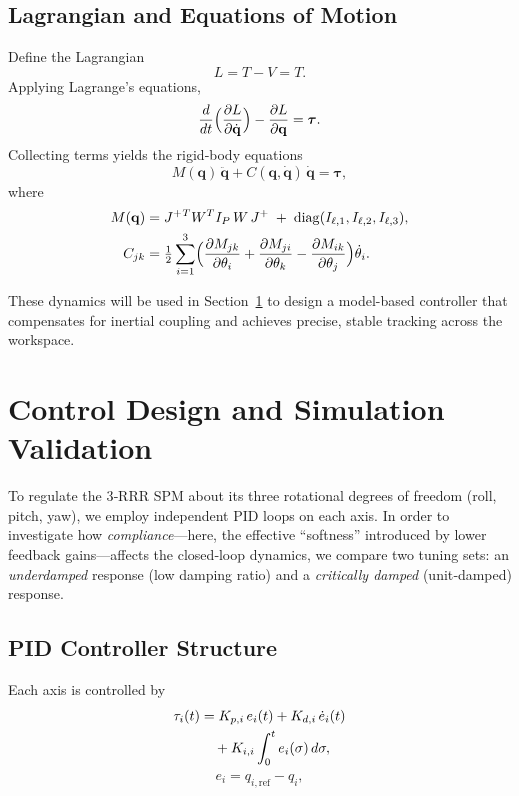 \documentclass[letterpaper, 10 pt, conference]{ieeeconf}  %
\begin{document}
\subsection{Lagrangian and Equations of Motion}
Define the Lagrangian
\[
  L = T - V = T.
\]
Applying Lagrange’s equations,
\begin{equation}
  \frac{d}{dt}\Bigl(\frac{\partial L}{\partial\dot{\mathbf{q}}}\Bigr)
  -
  \frac{\partial L}{\partial \mathbf{q}}
  =
  \boldsymbol{\tau}.
\end{equation}
Collecting terms yields the rigid‑body equations
\begin{equation}
  M(\mathbf{q})\,\ddot{\mathbf{q}}
  + C(\mathbf{q},\dot{\mathbf{q}})\,\dot{\mathbf{q}}
  = \boldsymbol{\tau},
\end{equation}
where
\begin{align}
  M(\mathbf{q})
  &= J^+{}^{T}W^T I_P\,W\,J^+ \;+\; \mathrm{diag}(I_{\ell,1},I_{\ell,2},I_{\ell,3}),\\
  C_{jk}
  &= \tfrac12\sum_{i=1}^3
    \Bigl(
      \frac{\partial M_{jk}}{\partial \theta_i}
      + \frac{\partial M_{ji}}{\partial \theta_k}
      - \frac{\partial M_{ik}}{\partial \theta_j}
    \Bigr)\dot{\theta}_i.
\end{align}

These dynamics will be used in Section~\ref{sec:control} to design a model-based controller that compensates for inertial coupling and achieves precise, stable tracking across the workspace.  
\section{Control Design and Simulation Validation}
\label{sec:control}
To regulate the 3‑RRR SPM about its three rotational degrees of freedom (roll, pitch, yaw), we employ independent PID loops on each axis.  In order to investigate how \emph{compliance}—here, the effective “softness” introduced by lower feedback gains—affects the closed‑loop dynamics, we compare two tuning sets: an \emph{underdamped} response (low damping ratio) and a \emph{critically damped} (unit‑damped) response.

\subsection{PID Controller Structure}
Each axis is controlled by
\begin{align}
  \tau_i(t) &= K_{p,i}\,e_i(t) + K_{d,i}\,\dot{e}_i(t) \notag \\
            &\quad + K_{i,i} \int_0^t e_i(\sigma)\,d\sigma,
\end{align}
\[
  e_i = q_{i,\mathrm{ref}} - q_i,
\]
\end{document}
